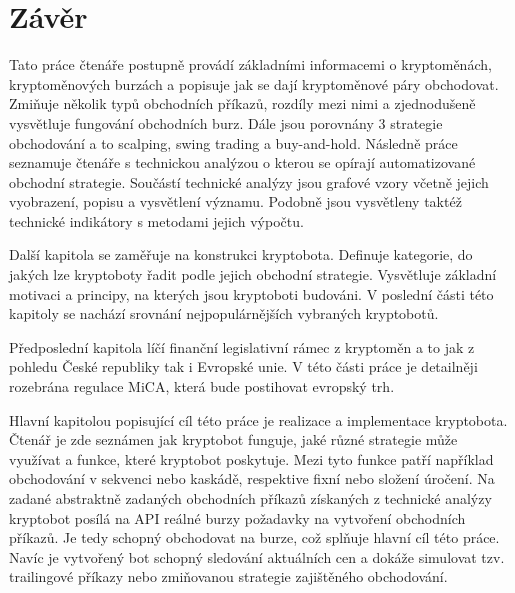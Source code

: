 \chapter{Závěr}
Tato práce čtenáře postupně provádí základními informacemi o kryptoměnách, kryptoměnových burzách a popisuje jak se dají kryptoměnové
páry obchodovat. Zmiňuje několik typů obchodních příkazů, rozdíly mezi nimi a zjednodušeně vysvětluje fungování obchodních burz. Dále jsou
porovnány 3 strategie obchodování a to scalping, swing trading a buy-and-hold. Následně práce seznamuje čtenáře s technickou analýzou o kterou
se opírají automatizované obchodní strategie. 
Součástí technické analýzy jsou grafové vzory včetně jejich vyobrazení, popisu a vysvětlení významu. Podobně jsou vysvětleny taktéž technické
indikátory s metodami jejich výpočtu.

Další kapitola se zaměřuje na konstrukci kryptobota. Definuje kategorie, do jakých lze kryptoboty řadit podle jejich obchodní strategie. Vysvětluje
základní motivaci a principy, na kterých jsou kryptoboti budováni. V poslední části této kapitoly se nachází srovnání nejpopulárnějších vybraných
kryptobotů.

Předposlední kapitola líčí finanční legislativní rámec z kryptoměn a to jak z pohledu České republiky tak i Evropské unie. V této části práce je
detailněji rozebrána regulace MiCA, která bude postihovat evropský trh.

Hlavní kapitolou popisující cíl této práce je realizace a implementace kryptobota. Čtenář je zde seznámen jak kryptobot funguje, jaké různé strategie
může využívat a funkce, které kryptobot poskytuje. Mezi tyto funkce patří například obchodování v sekvenci nebo kaskádě, respektive fixní nebo složení úročení.
Na zadané abstraktně zadaných obchodních příkazů získaných z technické analýzy kryptobot posílá na API reálné burzy požadavky na vytvoření obchodních příkazů.
Je tedy schopný obchodovat na burze, což splňuje hlavní cíl této práce. Navíc je vytvořený bot schopný sledování aktuálních cen a dokáže simulovat tzv. trailingové
příkazy nebo zmiňovanou strategie zajištěného obchodování.


\endinput
